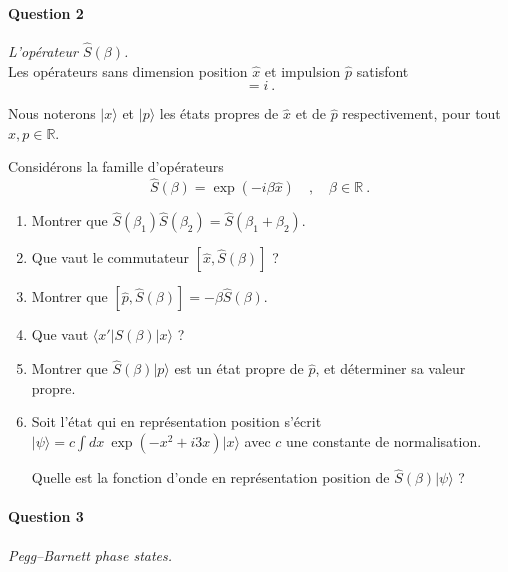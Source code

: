 \paragraph{Question 2} \textit{L'opérateur $\hat S(\beta)$.} \\

Les opérateurs sans dimension position $\hat x$ et impulsion $\hat p$ satisfont 
\begin{equation}
[\hat x, \hat p ] = i\ .
\label{xp:1}
\end{equation}

Nous noterons $\lvert x \rangle$ et $\lvert p \rangle$ les états propres de $\hat x$ et de $\hat p $ respectivement, pour tout $x, p \in \mathbb{R}$.

Considérons la famille d'opérateurs
\begin{equation}
\hat S(\beta) = \exp \left( -i \beta \hat x \right)\quad , \quad \beta \in \mathbb{R}\ .
\end{equation}




\begin{enumerate}


\item 
Montrer que $\hat S(\beta_1) \hat S(\beta_2)=\hat S(\beta_1 + \beta_2) $. 

\item
Que vaut le commutateur $[ \hat x,  \hat S(\beta)]$ ?

\item
Montrer que $[ \hat p,  \hat S(\beta)] = - \beta \hat S(\beta)$.


\item
Que vaut $\langle x' \rvert S(\beta) \lvert x \rangle$ ?

\item
Montrer que $\hat S(\beta) \lvert p \rangle$ est un état propre de $\hat p$, et déterminer sa valeur propre.

\item Soit l'état qui en représentation position s'écrit $\lvert \psi\rangle = c\int dx\ \exp (-x^2 + i 3 x)\lvert x \rangle$  avec $c$ une constante de normalisation.

Quelle est la fonction d'onde en représentation position de 
$\hat S(\beta) \lvert \psi\rangle $ ?


\end{enumerate}


\paragraph{Question 3} \textit{Pegg--Barnett phase states.} \\




